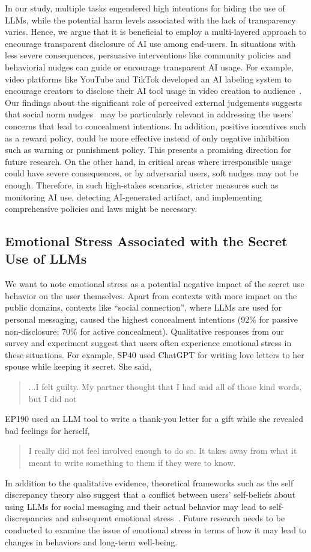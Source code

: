 In our study, multiple tasks engendered high intentions for hiding the use of LLMs, while the potential harm levels associated with the lack of transparency varies.
Hence, we argue that it is beneficial to employ a multi-layered approach to encourage transparent disclosure of AI use among end-users.
In situations with less severe consequences, persuasive interventions like community policies and behaviorial nudges can guide or encourage transparent AI usage. 
For example, video platforms like YouTube and TikTok developed an AI labeling system to encourage creators to disclose their AI tool usage in video creation to audience~\cite{YouTube2024ResponsibleAI, TikTok2024AIGenerated}.
Our findings about the significant role of perceived external judgements suggests that social norm nudges~\cite{bicchieri2023norm} may be particularly relevant in addressing the users' concerns that lead to concealment intentions.
In addition, positive incentives such as a reward policy, could be more effective instead of only negative inhibition such as warning or punishment policy. 
This presents a promising direction for future research.
On the other hand, in critical areas where irresponsible usage could have severe consequences, or by adversarial users, soft nudges may not be enough. 
Therefore, in such high-stakes scenarios, stricter measures such as monitoring AI use, detecting AI-generated artifact, and implementing comprehensive policies and laws might be necessary.



\subsection{Emotional Stress Associated with the Secret Use of LLMs}
We want to note emotional stress as a potential negative impact of the secret use behavior on the user themselves.
Apart from contexts with more impact on the public domains, contexts like ``social connection'', where LLMs are used for personal messaging, caused the highest concealment intentions (92\% for passive non-disclosure; 70\% for active concealment). 
Qualitative responses from our survey and experiment suggest that users often experience emotional stress in these situations. 
For example, SP40 used ChatGPT for writing love letters to her spouse while keeping it secret. 
She said, ~\blockquote{...I felt guilty. My partner thought that I had said all of those kind words, but I did not}.
EP190 used an LLM tool to write a thank-you letter for a gift while she revealed bad feelings for herself,~\blockquote{I really did not feel involved enough to do so. It takes away from what it meant to write something to them if they were to know.}
In addition to the qualitative evidence, theoretical frameworks such as the self discrepancy theory also suggest that a conflict between users' self-beliefs about using LLMs for social messaging and their actual behavior may lead to self-discrepancies and subsequent emotional stress~\cite{carver1999self, scott1993self}.
Future research needs to be conducted to examine the issue of emotional stress in terms of how it may lead to changes in behaviors and long-term well-being.



